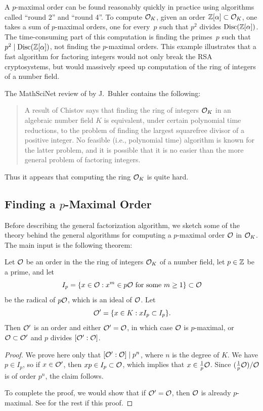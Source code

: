 A $p$-maximal order can be found reasonably quickly in practice using
algorithms called ``round 2'' and ``round 4''.  To
compute $\mathcal{O}_K$, given an order $\mathbb{Z}[\alpha]\subset \mathcal{O}_K$, one takes a
sum of $p$-maximal orders, one for every~$p$ such that $p^2$ divides
$\operatorname{Disc}(\mathbb{Z}[\alpha])$.  The time-consuming part of this computation is
finding the primes~$p$ such that $p^2\mid \operatorname{Disc}(\mathbb{Z}[\alpha])$, not
finding the $p$-maximal orders.  This example illustrates that
a fast algorithm for factoring integers would not only break the RSA
cryptosystems, but would massively speed up computation of the ring of
integers of a number field.
\begin{remark}
The MathSciNet review of \cite{buchmann_lenstra:approx} by
J.~Buhler contains the following:
\begin{quote}
    A result of Chistov says that finding the ring of integers $\mathcal{O}_K$
    in an algebraic number field $K$ is equivalent, under certain
    polynomial time reductions, to the problem of finding the largest
    squarefree divisor of a positive integer. No feasible (i.e.,
    polynomial time) algorithm is known for the latter problem, and it
    is possible that it is no easier than the more general problem of
    factoring integers.
\end{quote}
Thus it appears that computing the ring $\mathcal{O}_K$ is quite hard.
\end{remark}

\subsection{Finding a $p$-Maximal Order}\label{sec:alg_pmax}
Before describing the general factorization algorithm, we sketch some
of the theory behind the general algorithms for computing a
$p$-maximal order $\mathcal{O}$ in $\mathcal{O}_K$.  The main input is the following
theorem:
\begin{theorem}
Let $\mathcal{O}$ be an order in the the ring of integers $\mathcal{O}_K$ of a number field, let $p\in\mathbb{Z}$ be a prime,
and let
$$I_p = \{x \in \mathcal{O} : x^m \in p\mathcal{O} \text{ for some $m\geq 1$}\} \subset \mathcal{O}$$
be the radical of $p\mathcal{O}$, which is an ideal of $\mathcal{O}$.
Let
$$
  \mathcal{O}' = \{x \in K : xI_p \subset I_p\}.
$$
Then $\mathcal{O}'$ is an order and either $\mathcal{O}'=\mathcal{O}$, in which case $\mathcal{O}$ is
$p$-maximal, or $\mathcal{O}\subset\mathcal{O}'$ and $p$ divides $[\mathcal{O}':\mathcal{O}]$.
\end{theorem}
\begin{proof}
  We prove here only that $[\mathcal{O}':\mathcal{O}] \mid p^n$, where $n$ is the degree
  of $K$.  We have $p\in I_p$, so if $x \in \mathcal{O}'$, then $xp \in
  I_p\subset \mathcal{O}$, which implies that $x\in \frac{1}{p}\mathcal{O}$.  Since
  $(\frac{1}{p}\mathcal{O})/\mathcal{O}$ is of order $p^n$, the claim follows.

To complete the proof, we would show that if $\mathcal{O}' = \mathcal{O}$, then $\mathcal{O}$ is
already $p$-maximal.  See \cite[\S6.1.1]{cohen:course_ant} for the
rest if this proof.
\end{proof}

